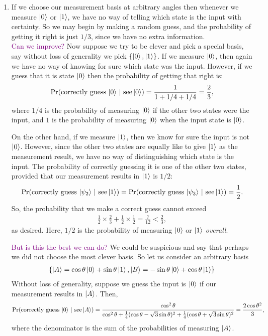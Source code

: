 \documentclass{article}
\theoremstyle{definition}
\newcommand{\f}[2]{\frac{#1}{#2}}
\begin{document}
\begin{enumerate}[label=(\alph*)]
	
	\item If we choose our measurement basis at arbitrary angles then whenever we measure $\ket{0}$ or $\ket{1}$, we have no way of telling which state is the input with certainty. So we may begin by  making a random guess, and the probability of getting it right is just $1/3$, since we have no extra information. \\
	
	\textcolor{purple}{Can we improve?} Now suppose we try to be clever and pick a special basis, say without loss of generality we pick $\{\ket{0}, \ket{1}\}$. If we measure $\ket{0}$, then again we have no way of knowing for sure which state was the input. However, if we guess that it is state $\ket{0}$ then the probability of getting that right is:
	\begin{align*}
		\Pr(\text{correctly guess $\ket{0}$}\,\, | \,\, \text{see} \ket{0}) =  \f{1}{1+1/4+1/4} = \f{2}{3},
	\end{align*}
	where $1/4$ is the probability of measuring $\ket{0}$ if the other two states were the input, and $1$ is the probability of measuring $\ket{0}$ when the input state is $\ket{0}$. 
	
	On the other hand, if we measure $\ket{1}$, then we know for sure the input is not $\ket{0}$. However, since the other two states are equally like to give $\ket{1}$ as the measurement result, we have no way of distinguishing which state is the input. The probability of correctly guessing it is one of the other two states, provided that our measurement results in $\ket{1}$ is $1/2$:
	\begin{align*}
		\Pr(\text{correctly guess $\ket{\psi_2}$}\,\, | \,\, \text{see} \ket{1}) = \Pr(\text{correctly guess $\ket{\psi_3}$}\,\, | \,\, \text{see} \ket{1}) = \f{1}{2}.
	\end{align*}
	So, the probability that we make a correct guess cannot exceed
	\begin{align*}
		\f{1}{2}\times \f{2}{3} + \f{1}{2}\times \f{1}{2} = \f{7}{12} < \f{2}{3},
	\end{align*}
	as desired. Here, $1/2$ is the probability of measuring $\ket{0}$ or $\ket{1}$ \textit{overall}. 
	
	\textcolor{purple}{But is this the best we can do?} We could be suspicious and say that perhaps we did not choose the most clever basis. So let us consider an arbitrary basis 
	\begin{align*}
		\{ \ket{A} = \cos\theta \ket{0} + \sin\theta \ket{1} , \ket{B} =  -\sin\theta\ket{0} + \cos\theta\ket{1}    \}
	\end{align*}
	Without loss of generality, suppose we guess the input is $\ket{0}$ if our measurement results in $\ket{A}$. Then, 
	\begin{align*}
		\Pr(\text{correctly guess $\ket{0}$}\,\, | \,\, \text{see} \ket{A}) =  \f{\cos^2\theta}{\cos^2\theta + \f{1}{4}(\cos\theta - \sqrt{3}\sin\theta)^2 + \f{1}{4}(\cos\theta + \sqrt{3}\sin\theta)^2} = \f{2\cos\theta^2}{3},
	\end{align*}
	where the denominator is the sum of the probabilities of measuring $\ket{A}$. 
	

\end{enumerate}
\end{document}
